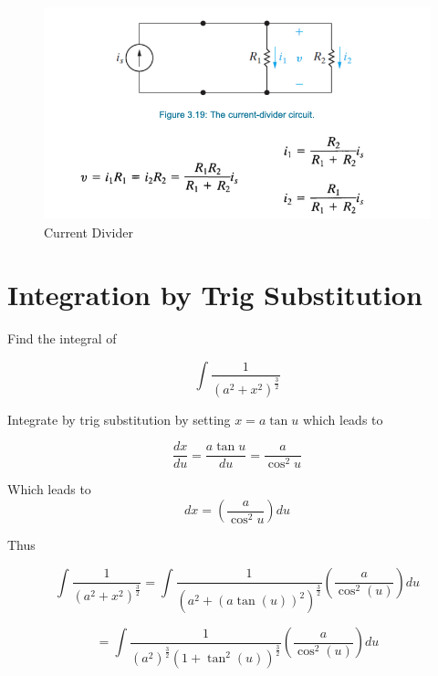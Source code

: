 \documentclass[14pt]{memoir}
\begin{document}
\begin{figure}[H]
\begin{center}
\includegraphics[scale=0.50]{fig/fig03_19.png}
\caption{Current Divider}
\label{fig:fig03_19}
\end{center}
\end{figure}

\appendix

\chapter{Integration by Trig Substitution}
\label{sec:trigsub}

Find the integral of 

\begin{equation}
\int \frac{1}{(a^2 + x^2)^{\frac{3}{2}}}
\end{equation}

Integrate by trig substitution by setting $x = a\tan{u}$ which leads to 

\begin{equation}
\frac{dx}{du} = \frac{a \tan{u}}{du} = \frac{a}{\cos^2{u}}
\end{equation}

Which leads to 
\begin{equation}
dx = ( \frac{a}{\cos^2{u}}) du 
\end{equation}

Thus

\begin{equation}
\int \frac{1}{(a^2 + x^2)^{\frac{3}{2}}} =  \int \frac{1}{(a^2 + (a\tan{(u)})^2)^{\frac{3}{2}}} ( \frac{a}{\cos^2{(u)}}) du
\end{equation}

\begin{equation}
=  \int \frac{1}{(a^2)^{\frac{3}{2}} (1 + \tan^2{(u)})^{\frac{3}{2}}} ( \frac{a}{\cos^2{(u)}}) du
\end{equation}
\end{document}
